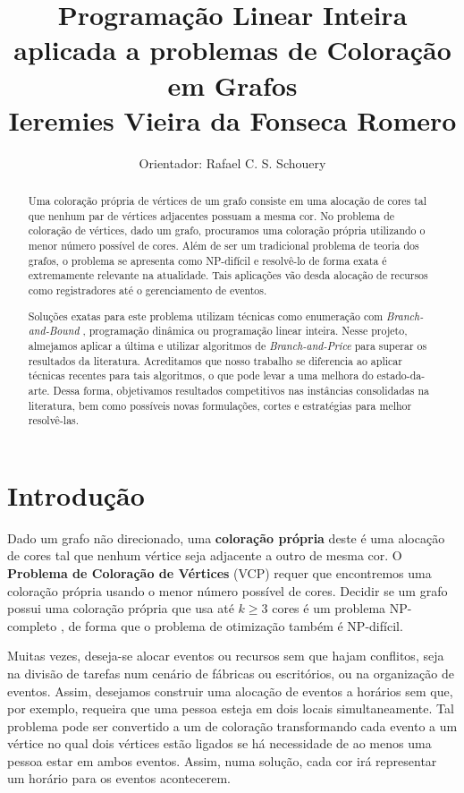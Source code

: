 \documentclass[10pt]{article}
\author{Orientador: Rafael C. S. Schouery}
\date{}
\title{Programação Linear Inteira aplicada a problemas de Coloração em Grafos\\\medskip
\large Ieremies Vieira da Fonseca Romero}
\begin{document}
\maketitle
\begin{abstract}
Uma coloração própria de vértices de um grafo consiste em uma alocação de cores tal que nenhum par de vértices adjacentes possuam a mesma cor.
No problema de coloração de vértices, dado um grafo, procuramos uma coloração própria utilizando o menor número possível de cores.
Além de ser um tradicional problema de teoria dos grafos, o problema se apresenta como NP-difícil e resolvê-lo de forma exata é extremamente relevante na atualidade.
Tais aplicações vão desda alocação de recursos como registradores até o gerenciamento de eventos.

Soluções exatas para este problema utilizam técnicas como enumeração com \emph{Branch-and-Bound} \autocite{Furini2016ImprovedDSATURBased}, programação dinâmica \autocites{Eppstein2006SmallMaximalIndependent}[][]{Byskov2002ChromaticNumberTime} ou programação linear inteira.
Nesse projeto, almejamos aplicar a última e utilizar algoritmos de \emph{Branch-and-Price} para superar os resultados da literatura.
Acreditamos que nosso trabalho se diferencia ao aplicar técnicas recentes para tais algoritmos, o que pode levar a uma melhora do estado-da-arte.
Dessa forma, objetivamos resultados competitivos nas instâncias consolidadas na literatura, bem como possíveis novas formulações, cortes e estratégias para melhor resolvê-las.
\end{abstract}

\section{Introdução}
\label{sec:org73a4276}
Dado um grafo não direcionado, uma \textbf{coloração própria} deste é uma alocação de cores tal que nenhum vértice seja adjacente a outro de mesma cor.
O \textbf{Problema de Coloração de Vértices} (VCP) requer que encontremos uma coloração própria usando o menor número possível de cores.
Decidir se um grafo possui uma coloração própria que usa até \(k \geq 3\) cores é um problema NP-completo \autocite{Garey1979ComputersIntractabilityGuide}, de forma que o problema de otimização também é NP-difícil.

Muitas vezes, deseja-se alocar eventos ou recursos sem que hajam conflitos, seja na divisão de tarefas num cenário de fábricas ou escritórios, ou na organização de eventos.
Assim, desejamos construir uma alocação de eventos a horários sem que, por exemplo, requeira que uma pessoa esteja em dois locais simultaneamente.
Tal problema pode ser convertido a um de coloração transformando cada evento a um vértice no qual dois vértices estão ligados se há necessidade de ao menos uma pessoa estar em ambos eventos.
Assim, numa solução, cada cor irá representar um horário para os eventos acontecerem.
\end{document}
